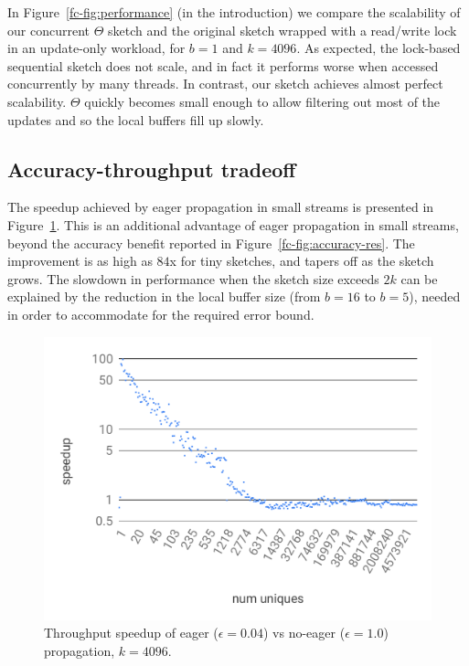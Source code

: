 In Figure~\ref{fc-fig:performance} (in the introduction) we compare the scalability
of our concurrent $\Theta$ sketch and the original sketch wrapped
with a read/write lock in an update-only workload, for $b=1$ and $k=4096$.
As expected, the lock-based sequential sketch does not scale, and
in fact it performs worse when accessed concurrently by many threads.
In contrast, our sketch achieves almost perfect scalability.
$\Theta$ quickly becomes small enough to allow filtering out most of the updates and so the
local buffers fill up slowly.


\subsection{Accuracy-throughput tradeoff}
\label{fc-ssec:tradeoffs}

The speedup achieved by eager propagation in small streams is presented in Figure~\ref{fc-fig:speedup}.
This is an additional advantage of eager propagation in small streams, beyond the accuracy benefit reported in Figure~\ref{fc-fig:accuracy-res}. 
The improvement is as high as $84$x for tiny sketches, and tapers off as the sketch grows.
The slowdown in performance when the sketch size exceeds $2k$ can be explained by the reduction
in the local buffer size (from $b=16$ to $b=5$), needed in order to accommodate for the required error bound.

\begin{figure}[tb]
\setlength{\abovecaptionskip}{0pt}
\setlength{\belowcaptionskip}{0pt}
\setlength\textfloatsep{0pt}
	\centering
	\includegraphics[width=\columnwidth]{graphics/fast-concurrent/eager-speedup.pdf}
	\caption{{Throughput speedup of eager ($\epsilon=0.04$) vs no-eager ($\epsilon=1.0$) propagation, $k = 4096$.}}
	\label{fc-fig:speedup}
\end{figure}


